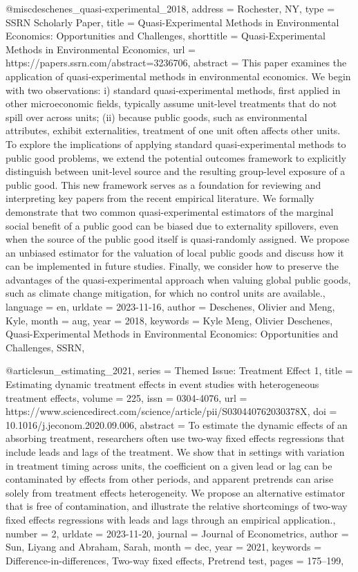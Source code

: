 {{{@misc{deschenes_quasi-experimental_2018,
	address = {Rochester, NY},
	type = {{SSRN} {Scholarly} {Paper}},
	title = {Quasi-{Experimental} {Methods} in {Environmental} {Economics}: {Opportunities} and {Challenges}},
	shorttitle = {Quasi-{Experimental} {Methods} in {Environmental} {Economics}},
	url = {https://papers.ssrn.com/abstract=3236706},
	abstract = {This paper examines the application of quasi-experimental methods in environmental economics. We begin with two observations: i) standard quasi-experimental methods, first applied in other microeconomic fields, typically assume unit-level treatments that do not spill over across units; (ii) because public goods, such as environmental attributes, exhibit externalities, treatment of one unit often affects other units. To explore the implications of applying standard quasi-experimental methods to public good problems, we extend the potential outcomes framework to explicitly distinguish between unit-level source and the resulting group-level exposure of a public good. This new framework serves as a foundation for reviewing and interpreting key papers from the recent empirical literature. We formally demonstrate that two common quasi-experimental estimators of the marginal social benefit of a public good can be biased due to externality spillovers, even when the source of the public good itself is quasi-randomly assigned. We propose an unbiased estimator for the valuation of local public goods and discuss how it can be implemented in future studies. Finally, we consider how to preserve the advantages of the quasi-experimental approach when valuing global public goods, such as climate change mitigation, for which no control units are available.},
	language = {en},
	urldate = {2023-11-16},
	author = {Deschenes, Olivier and Meng, Kyle},
	month = aug,
	year = {2018},
	keywords = {Kyle Meng, Olivier Deschenes, Quasi-Experimental Methods in Environmental Economics: Opportunities and Challenges, SSRN},
}

@article{sun_estimating_2021,
	series = {Themed {Issue}: {Treatment} {Effect} 1},
	title = {Estimating dynamic treatment effects in event studies with heterogeneous treatment effects},
	volume = {225},
	issn = {0304-4076},
	url = {https://www.sciencedirect.com/science/article/pii/S030440762030378X},
	doi = {10.1016/j.jeconom.2020.09.006},
	abstract = {To estimate the dynamic effects of an absorbing treatment, researchers often use two-way fixed effects regressions that include leads and lags of the treatment. We show that in settings with variation in treatment timing across units, the coefficient on a given lead or lag can be contaminated by effects from other periods, and apparent pretrends can arise solely from treatment effects heterogeneity. We propose an alternative estimator that is free of contamination, and illustrate the relative shortcomings of two-way fixed effects regressions with leads and lags through an empirical application.},
	number = {2},
	urldate = {2023-11-20},
	journal = {Journal of Econometrics},
	author = {Sun, Liyang and Abraham, Sarah},
	month = dec,
	year = {2021},
	keywords = {Difference-in-differences, Two-way fixed effects, Pretrend test},
	pages = {175--199},
}

}}}

